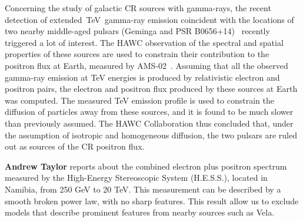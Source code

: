 \documentclass{PoS}
\begin{document}
Concerning the study of galactic CR sources with gamma-rays, the recent detection of extended~TeV~gamma-ray emission coincident with the 
locations of two nearby middle-aged pulsars (Geminga and PSR 
B0656+14)~\cite{HAWCpositrons} recently triggered a lot of interest. The HAWC observation of the spectral and spatial properties of these sources are used
to constrain their contribution to the positron flux at Earth, measured by AMS-02~\cite{positrons}. Assuming that all the observed gamma-ray emission at TeV energies is
produced by relativistic electron and positron pairs, the electron and positron
flux produced by these sources at Earth was computed. The measured TeV emission profile is used to constrain the diffusion of particles away from these
sources, and it is found to be much slower than previously assumed. The HAWC Collaboration thus concluded that, under the assumption of isotropic and homogeneous diffusion, the two pulsars are ruled out as sources of the CR positron flux.

{\bf Andrew Taylor} reports about the combined electron plus positron spectrum  measured by the High-Energy Stereoscopic System (H.E.S.S.), located in Namibia, from 250 GeV to 20 TeV. This measurement can be described by a smooth broken power law, with no sharp features. This result allow us to exclude models that describe prominent features from nearby sources such as Vela.








\end{document}
